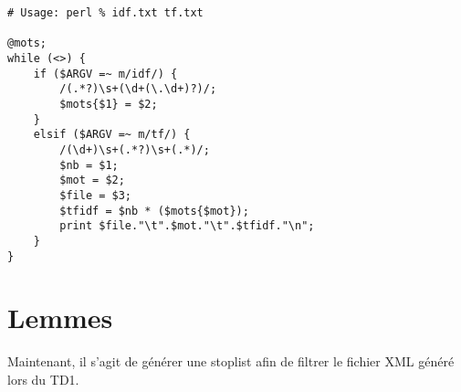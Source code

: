 \begin{lstlisting}
# Usage: perl % idf.txt tf.txt

@mots;
while (<>) {
    if ($ARGV =~ m/idf/) {
        /(.*?)\s+(\d+(\.\d+)?)/;
        $mots{$1} = $2;
    }
    elsif ($ARGV =~ m/tf/) {
        /(\d+)\s+(.*?)\s+(.*)/;
        $nb = $1;
        $mot = $2;
        $file = $3;
        $tfidf = $nb * ($mots{$mot});
        print $file."\t".$mot."\t".$tfidf."\n";
    }
}
\end{lstlisting}
\fakeshell

\section{Lemmes}

Maintenant, il s'agit de générer une stoplist afin de filtrer le fichier XML généré lors du TD1.
